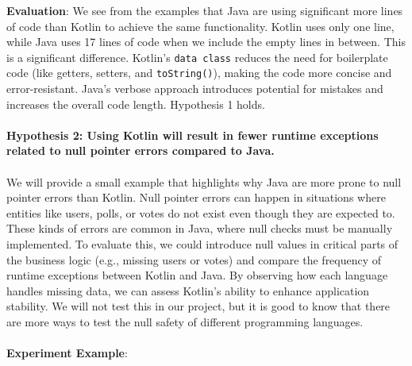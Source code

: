 \noindent \textbf{Evaluation}: We see from the examples that Java are using significant more lines of code than Kotlin to achieve the same functionality. Kotlin uses only one line, while Java uses 17 lines of code when we include the empty lines in between. This is a significant difference. Kotlin's \texttt{data class} reduces the need for boilerplate code (like getters, setters, and \texttt{toString()}), making the code more concise and error-resistant. Java’s verbose approach introduces potential for mistakes and increases the overall code length.  Hypothesis 1 holds. 
\\
\\
\textbf{Hypothesis 2: Using Kotlin will result in fewer runtime exceptions related to null pointer errors compared to Java.} 
\\
\\ 
We will provide a small example that highlights why Java are more prone to null pointer errors than Kotlin. Null pointer errors can happen in situations where entities like users, polls, or votes do not exist even though they are expected to. These kinds of errors are common in Java, where null checks must be manually implemented. To evaluate this, we could introduce null values in critical parts of the business logic (e.g., missing users or votes) and compare the frequency of runtime exceptions between Kotlin and Java. By observing how each language handles missing data, we can assess Kotlin’s ability to enhance application stability. We will not test this in our project, but it is good to know that there are more ways to test the null safety of different programming languages.
\\
\\
\textbf{Experiment Example}:

